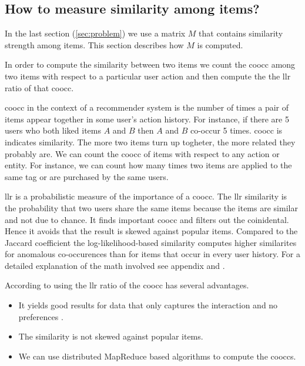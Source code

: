 \subsection{How to measure similarity among items?}
\label{sec:llr}

In the last section (\ref{sec:problem}) we use a matrix $M$ that contains similarity strength among items. This section describes how $M$ is computed.

In order to compute the similarity between two items we count the \gls{coocc} among two items with respect to a particular user action and then compute the the \gls{llr} ratio of that \gls{coocc}.

\gls{coocc} in the context of a recommender system is the number of times a pair of items appear together in some user's action history. For instance, if there are 5 users who both liked items $A$ and $B$ then $A$ and $B$ co-occur 5 times. \gls{coocc} is indicates similarity. The more two items turn up togheter, the more related they probably are. We can count the \gls{coocc} of items with respect to any action or entity. For instance, we can count how many times two items are applied to the same tag or are purchased by the same users.

\gls{llr} is a probabilistic measure of the importance of a \gls{coocc}. The \gls{llr} similarity  is the probability that two users share the same items because the items are similar and not due to chance. It finds important \gls{coocc} and filters out the coinidental. Hence it avoids that the result is skewed against popular items. Compared to the Jaccard coefficient \cite{Hartung} the log-likelihood-based similarity computes higher similarites for anomalous co-occurences than for items that occur in every user history. For a detailed explanation of the math involved see appendix and \cite{Dunning93}. 

According to \cite{Dunning14} using the \gls{llr} ratio of the \gls{coocc} has several advantages.
\begin{itemize}
\item It yields good results for data that only captures the interaction and no \glspl{preference} \cite{Dunning93}.
\item The similarity is not skewed against popular items.
\item We can use distributed MapReduce based algorithms to compute the \glspl{coocc}.
\end{itemize}

